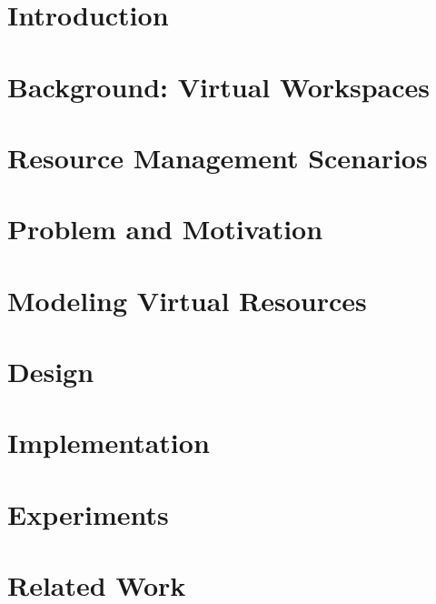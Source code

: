 \documentclass[singlespace]{ccw_chithesis}
\begin{document}
\tableofcontents
\listoffigures
\listoftables

\renewcommand{\chaptername}{Section}

\mainmatter

\chapter{Introduction}
\label{cha:introduction}



\chapter{Background: Virtual Workspaces}
\label{cha:background}



\chapter{Resource Management Scenarios}
\label{cha:scenarios}



\chapter{Problem and Motivation}
\label{cha:problem}



\chapter{Modeling Virtual Resources}
\label{cha:virtualresources}



\chapter{Design}
\label{cha:design}


\chapter{Implementation}
\label{cha:impl}



\chapter{Experiments}
\label{cha:experiments}



\chapter{Related Work}
\label{cha:related}

\end{document}
